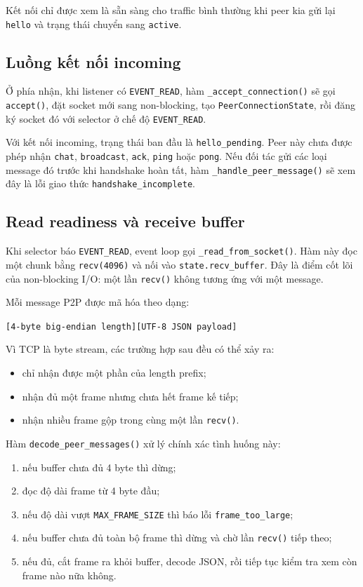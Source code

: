 Kết nối chỉ được xem là sẵn sàng cho traffic bình thường khi peer kia gửi lại \texttt{hello} và trạng thái chuyển sang \texttt{active}.

\subsection{Luồng kết nối incoming}
Ở phía nhận, khi listener có \texttt{EVENT\_READ}, hàm \texttt{\_accept\_connection()} sẽ gọi \texttt{accept()}, đặt socket mới sang non-blocking, tạo \texttt{PeerConnectionState}, rồi đăng ký socket đó với selector ở chế độ \texttt{EVENT\_READ}.

Với kết nối incoming, trạng thái ban đầu là \texttt{hello\_pending}. Peer này chưa được phép nhận \texttt{chat}, \texttt{broadcast}, \texttt{ack}, \texttt{ping} hoặc \texttt{pong}. Nếu đối tác gửi các loại message đó trước khi handshake hoàn tất, hàm \texttt{\_handle\_peer\_message()} sẽ xem đây là lỗi giao thức \texttt{handshake\_incomplete}.

\subsection{Read readiness và receive buffer}
Khi selector báo \texttt{EVENT\_READ}, event loop gọi \texttt{\_read\_from\_socket()}. Hàm này đọc một chunk bằng \texttt{recv(4096)} và nối vào \texttt{state.recv\_buffer}. Đây là điểm cốt lõi của non-blocking I/O: một lần \texttt{recv()} không tương ứng với một message.

Mỗi message P2P được mã hóa theo dạng:
\begin{center}
\texttt{[4-byte big-endian length][UTF-8 JSON payload]}
\end{center}

Vì TCP là byte stream, các trường hợp sau đều có thể xảy ra:
\begin{itemize}[leftmargin=2em]
    \item chỉ nhận được một phần của length prefix;
    \item nhận đủ một frame nhưng chưa hết frame kế tiếp;
    \item nhận nhiều frame gộp trong cùng một lần \texttt{recv()}.
\end{itemize}

Hàm \texttt{decode\_peer\_messages()} xử lý chính xác tình huống này:
\begin{enumerate}[leftmargin=2em]
    \item nếu buffer chưa đủ 4 byte thì dừng;
    \item đọc độ dài frame từ 4 byte đầu;
    \item nếu độ dài vượt \texttt{MAX\_FRAME\_SIZE} thì báo lỗi \texttt{frame\_too\_large};
    \item nếu buffer chưa đủ toàn bộ frame thì dừng và chờ lần \texttt{recv()} tiếp theo;
    \item nếu đủ, cắt frame ra khỏi buffer, decode JSON, rồi tiếp tục kiểm tra xem còn frame nào nữa không.
\end{enumerate}

